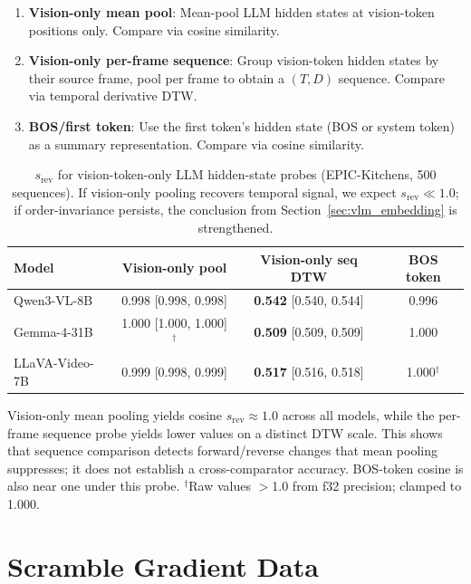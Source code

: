 \documentclass{article}
\theoremstyle{remark}
\begin{document}
\begin{enumerate}
    \item \textbf{Vision-only mean pool}: Mean-pool LLM hidden states at vision-token positions only. Compare via cosine similarity.
    \item \textbf{Vision-only per-frame sequence}: Group vision-token hidden states by their source frame, pool per frame to obtain a $(T, D)$ sequence. Compare via temporal derivative DTW.
    \item \textbf{BOS/first token}: Use the first token's hidden state (BOS or system token) as a summary representation. Compare via cosine similarity.
\end{enumerate}

\begin{table}[h]
\centering
\caption{$s_\text{rev}$ for vision-token-only LLM hidden-state probes (EPIC-Kitchens, 500 sequences). If vision-only pooling recovers temporal signal, we expect $s_\text{rev} \ll 1.0$; if order-invariance persists, the conclusion from Section~\ref{sec:vlm_embedding} is strengthened.}
\label{tab:vision_token_probe}
\begin{tabular}{lccc}
\toprule
\textbf{Model} & \textbf{Vision-only pool} & \textbf{Vision-only seq DTW} & \textbf{BOS token} \\
\midrule
Qwen3-VL-8B    & 0.998 [0.998, 0.998] & \textbf{0.542} [0.540, 0.544] & 0.996 \\
Gemma-4-31B    & 1.000 [1.000, 1.000]$^\dagger$ & \textbf{0.509} [0.509, 0.509] & 1.000 \\
LLaVA-Video-7B & 0.999 [0.998, 0.999] & \textbf{0.517} [0.516, 0.518] & 1.000$^\dagger$ \\
\bottomrule
\end{tabular}
\begin{flushleft}
\small Vision-only mean pooling yields cosine $s_\text{rev} \approx 1.0$ across all models, while the per-frame sequence probe yields lower values on a distinct DTW scale. This shows that sequence comparison detects forward/reverse changes that mean pooling suppresses; it does not establish a cross-comparator accuracy. BOS-token cosine is also near one under this probe. $^\dagger$Raw values $>$1.0 from f32 precision; clamped to 1.000.
\end{flushleft}
\end{table}

\section{Scramble Gradient Data}
\label{sec:scramble_data}
\end{document}
